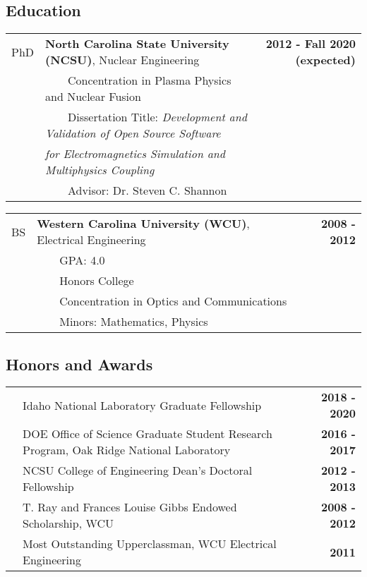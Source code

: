 \documentclass{article}
\newcommand{\tabitem}{~~\textbullet~~}
\begin{document}
\subsection*{Education}

	\begin{tabularx}{\textwidth}{l X r}
	PhD 	 & \textbf{North Carolina State University (NCSU)}, Nuclear Engineering & \textbf{2012 - Fall 2020 (expected)} \\
				 & \tabitem Concentration in Plasma Physics and Nuclear Fusion & \\
				 & \tabitem Dissertation Title: \textit{Development and Validation of Open Source Software} & \\
				 & \hspace{1.5em} \textit{for Electromagnetics Simulation and Multiphysics Coupling} & \\
				 & \tabitem Advisor: Dr. Steven C. Shannon & \\
	\end{tabularx}


	\noindent\begin{tabularx}{\textwidth}{l X r}
	BS		 & \textbf{Western Carolina University (WCU)}, Electrical Engineering & \textbf{2008 - 2012} \\
				 & \tabitem GPA: 4.0 & \\
				 & \tabitem Honors College & \\
				 & \tabitem Concentration in Optics and Communications & \\
				 & \tabitem Minors: Mathematics, Physics & \\
	\end{tabularx}

\subsection*{Honors and Awards}

	\begin{tabularx}{\textwidth}{l X r}
		\hspace{2em} & Idaho National Laboratory Graduate Fellowship & \textbf{2018 - 2020} \\
					 & DOE Office of Science Graduate Student Research Program, Oak Ridge National Laboratory & \textbf{2016 - 2017} \\
					 & NCSU College of Engineering Dean's Doctoral Fellowship & \textbf{2012 - 2013} \\
					 & T. Ray and Frances Louise Gibbs Endowed Scholarship, WCU & \textbf{2008 - 2012} \\
					 & Most Outstanding Upperclassman, WCU Electrical Engineering & \textbf{2011}
	\end{tabularx}
\end{document}
